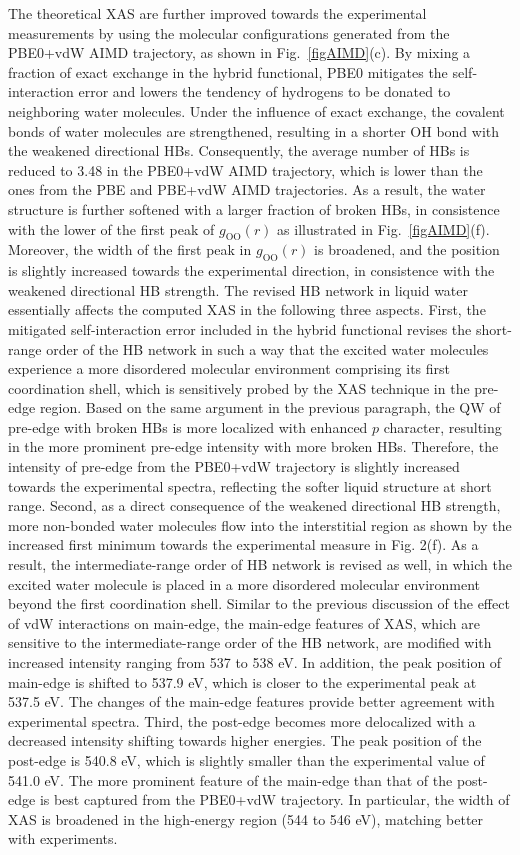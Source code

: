 \documentclass[prb,twocolumn,showpacs,preprintnumbers,superscriptaddress,amsmath,amssymb]{revtex4}
\begin{document}
The theoretical XAS are further improved towards the experimental measurements by using
the molecular configurations generated from the PBE0+vdW AIMD trajectory,
as shown in Fig.~\ref{figAIMD}(c).
By mixing a fraction of exact exchange in the hybrid functional,
PBE0 mitigates the self-interaction error
and lowers the tendency of hydrogens to be donated to neighboring water molecules.
Under the influence of exact exchange, the covalent bonds of water molecules are strengthened,
resulting in a shorter OH bond with the weakened directional HBs.
Consequently, the average number of HBs is reduced to 3.48 in the PBE0+vdW AIMD trajectory,
which is lower than the ones from the PBE and PBE+vdW AIMD trajectories.
As a result, the water structure is further softened with a larger fraction of broken HBs,
in consistence with the lower of the first peak of $g_{\mathrm{OO}}(r)$ as illustrated in Fig.~\ref{figAIMD}(f).
Moreover, the width of the first peak in $g_{\mathrm{OO}}(r)$ is broadened,
and the position is slightly increased towards the experimental direction,
in consistence with the weakened directional HB strength.
The revised HB network in liquid water essentially affects the computed XAS in the following three aspects.
%
First, the mitigated self-interaction error included in the hybrid functional
revises the short-range order of the HB network
in such a way that the excited water molecules experience a more disordered molecular environment comprising its first coordination shell,
which is sensitively probed by the XAS technique in the pre-edge region.
Based on the same argument in the previous paragraph,
the QW of pre-edge with broken HBs is more localized with enhanced $p$ character,
resulting in the more prominent pre-edge intensity with more broken HBs.
Therefore, the intensity of pre-edge from the PBE0+vdW trajectory is slightly increased towards the experimental spectra,
reflecting the softer liquid structure at short range.
%
Second, as a direct consequence of the weakened directional HB strength,
more non-bonded water molecules flow into the interstitial region as shown by the increased first minimum towards the experimental measure in Fig. 2(f).
As a result, the intermediate-range order of HB network is revised as well,
in which the excited water molecule is placed in a more disordered molecular environment beyond the first coordination shell.
Similar to the previous discussion of the effect of vdW interactions on main-edge, the main-edge features of XAS, which are sensitive to the intermediate-range order of the HB network, are modified with increased intensity ranging from 537 to 538 eV.
In addition, the peak position of main-edge is shifted to 537.9 eV, which is closer to the experimental peak at 537.5 eV.
The changes of the main-edge features provide better agreement with experimental spectra.
%
Third, the post-edge becomes more delocalized with a decreased intensity shifting towards higher energies.
The peak position of the post-edge is 540.8 eV, which is slightly smaller than the experimental value of 541.0 eV.
The more prominent feature of the main-edge than that of the post-edge is best captured from the PBE0+vdW trajectory.
In particular, the width of XAS is broadened in the high-energy region (544 to 546 eV), matching better with experiments.
%
\end{document}
